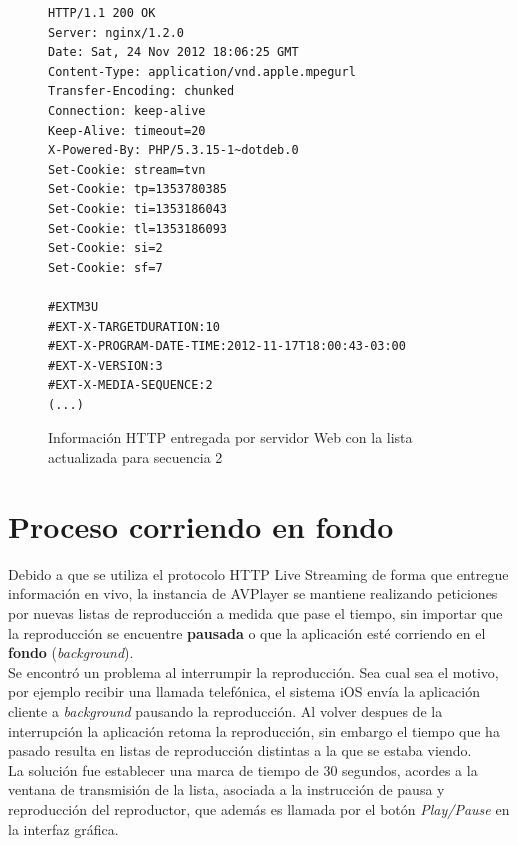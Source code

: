 \begin{figure}[H]
	\centering
\begin{lstlisting}
HTTP/1.1 200 OK
Server: nginx/1.2.0
Date: Sat, 24 Nov 2012 18:06:25 GMT
Content-Type: application/vnd.apple.mpegurl
Transfer-Encoding: chunked
Connection: keep-alive
Keep-Alive: timeout=20
X-Powered-By: PHP/5.3.15-1~dotdeb.0
Set-Cookie: stream=tvn
Set-Cookie: tp=1353780385
Set-Cookie: ti=1353186043
Set-Cookie: tl=1353186093
Set-Cookie: si=2
Set-Cookie: sf=7

#EXTM3U
#EXT-X-TARGETDURATION:10
#EXT-X-PROGRAM-DATE-TIME:2012-11-17T18:00:43-03:00
#EXT-X-VERSION:3
#EXT-X-MEDIA-SEQUENCE:2
(...)
\end{lstlisting}
\caption{Información HTTP entregada por servidor Web con la lista actualizada para secuencia 2}
\label{lst:sequence2}
\end{figure}





\section{Proceso corriendo en fondo} %

Debido a que se utiliza el protocolo HTTP Live Streaming de forma que entregue información en vivo, la instancia de AVPlayer se mantiene realizando peticiones por nuevas listas de reproducción a medida que pase el tiempo, sin importar que la reproducción se encuentre \textbf{pausada} o que la aplicación esté corriendo en el \textbf{fondo} (\textit{background}).\\

Se encontró un problema al interrumpir la reproducción. Sea cual sea el motivo, por ejemplo recibir una llamada telefónica, el sistema iOS envía la aplicación cliente a \textit{background} pausando la reproducción. Al volver despues de la interrupción la aplicación retoma la reproducción, sin embargo el tiempo que ha pasado resulta en listas de reproducción distintas a la que se estaba viendo.\\

La solución fue establecer una marca de tiempo de 30 segundos, acordes a la ventana de transmisión de la lista, asociada a la instrucción de pausa y reproducción del reproductor, que además es llamada por el botón \textit{Play/Pause} en la interfaz gráfica.\\

